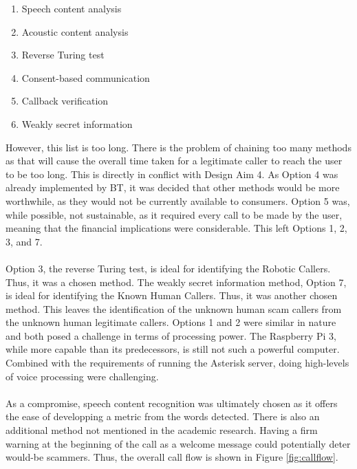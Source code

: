 \documentclass[main.tex]{subfiles}
\begin{document}
\begin{enumerate}
	\item Speech content analysis
	\item Acoustic content analysis
	\item Reverse Turing test
	\item Consent-based communication
	\item Callback verification
	\item Weakly secret information
\end{enumerate}

However, this list is too long. There is the problem of chaining too many methods as that will cause the overall time taken for a legitimate caller to reach the user to be too long. This is directly in conflict with Design Aim 4. As Option 4 was already implemented by BT, it was decided that other methods would be more worthwhile, as they would not be currently available to consumers. Option 5 was, while possible, not sustainable, as it required every call to be made by the user, meaning that the financial implications were considerable. This left Options 1, 2, 3, and 7.
\\\\
Option 3, the reverse Turing test, is ideal for identifying the Robotic Callers. Thus, it was a chosen method. The weakly secret information method, Option 7, is ideal for identifying the Known Human Callers. Thus, it was another chosen method. This leaves the identification of the unknown human scam callers from the unknown human legitimate callers. Options 1 and 2 were similar in nature and both posed a challenge in terms of processing power. The Raspberry Pi 3, while more capable than its predecessors, is still not such a powerful computer. Combined with the requirements of running the Asterisk server, doing high-levels of voice processing were challenging.
\\\\
As a compromise, speech content recognition was ultimately chosen as it offers the ease of developping a metric from the words detected. There is also an additional method not mentioned in the academic research. Having a firm warning at the beginning of the call as a welcome message could potentially deter would-be scammers. Thus, the overall call flow is shown in Figure \ref{fig:callflow}.
\end{document}
